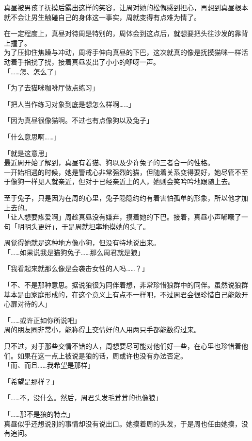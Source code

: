 真昼被男孩子抚摸后露出这样的笑容，让周对她的松懈感到担心，再想到真昼根本就不会让男生触碰自己的身体这一事实，周就变得有点难为情了。

在一定程度上，真昼对待周是特别的，周体会到这点后，就想要把头往沙发的靠背上撞了。\\

为了压抑住焦躁与冲动，周将手伸向真昼的下巴，这次就真的像是抚摸猫咪一样活动着手指挠了挠，接着真昼发出了小小的咿呀一声。\\

「……怎、怎么了」

「为了去猫咪咖啡厅做点练习」

「把人当作练习对象到底是想怎么样啊……」

「因为真昼很像猫啊。不过也有点像狗以及兔子」

「什么意思啊……」

「就是这意思」\\

最近周开始了解到，真昼有着猫、狗以及少许兔子的三者合一的性格。\\

一开始相遇的时候，她是警戒心非常强烈的猫，但随着关系变得要好，她尽管不至于像狗一样见人就亲近，但对于已经亲近上的人，她则会笑吟吟地跟随上去。

至于兔子，只是因为在周的心里，兔子隐隐约约有着害怕孤单的形象，所以他才加上去的。\\

「让人想要疼爱啊」周趁真昼没有嫌弃，摸着她的下巴。接着，真昼小声嘟囔了一句「明明头更好」，于是周就坦率地摸她的头了。

周觉得她就是这种地方像小狗，但没有特地说出来。\\

「……如果说我是猫狗兔子……那么周君就是狼」

「我看起来就那么像是会袭击女性的人吗……？」

「不、不是那种意思。据说狼很为同伴着想，非常珍惜狼群中的同伴。虽然说狼群基本是由家庭形成的，在这个意义上有点不一样吧，不过周君会很珍惜自己能敞开心扉对待的人」

「……或许正如你所说吧」\\

周的朋友圈非常小，能称得上交情好的人用两只手都能数得过来。

只不过，对于那些交情不错的人，周想要尽可能对他们好一些，在心里也珍惜着他们。如果在这一点上被说是狼的话，周或许也没有办法否定。\\

「而、而且……我希望是那样」

「希望是那样？」

「……不，没什么。然后，周君头发毛茸茸的也像狼」

「……那不是狼的特点」\\

真昼似乎还想说别的事情却没有说出口。她摸着周的头发，于是周也任由她摸，没有追问。
